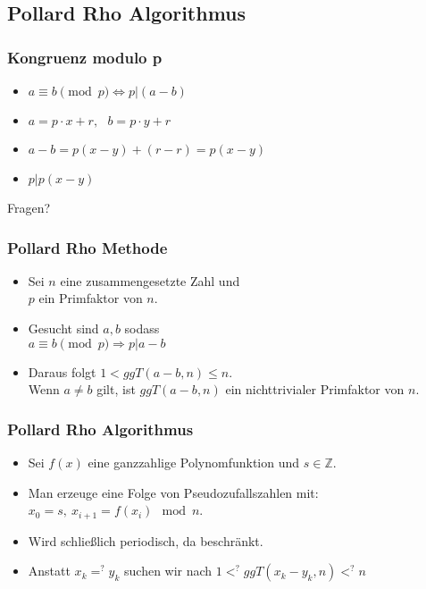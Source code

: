 \documentclass[mathserif, compress, german]{beamer}
\begin{document}
\subsection{Pollard Rho Algorithmus}

\begin{frame}
  \frametitle{Kongruenz modulo p}
  \begin{itemize}
	\item<1->$a \equiv b \pmod p \Leftrightarrow p|(a-b)$
\vspace{3mm}
	\item<2->$a=p\cdot x +r,\ \ \ b= p\cdot y +r$
\vspace{3mm}
	\item<3->$a-b=p(x-y)+(r-r)=p(x-y)$
\vspace{3mm}
	\item<4->$p|p(x-y)$
  \end{itemize}
\end{frame}

\begin{frame}
\centering Fragen?
\end{frame}


\begin{frame}
  \frametitle{Pollard Rho Methode}
  \begin{itemize}
    \item<2-> Sei $n$ eine zusammengesetzte Zahl und \\$p$ ein Primfaktor von $n$.
      \vspace{3mm}
    \item<3-> Gesucht sind $a, b$ sodass\\
              $a \equiv b \pmod p \Rightarrow p|a-b$ \\
      \vspace{3mm}
    \item<4-> Daraus folgt $1<ggT(a-b,n) \leq  n$. \\Wenn $a\not = b$ gilt, ist $ggT(a-b,n)$ ein nichttrivialer Primfaktor von $n$.
  \end{itemize}
\end{frame}

\begin{frame}
  \frametitle{Pollard Rho Algorithmus}
  \begin{itemize}
    \item<2-> Sei $f(x)$ eine ganzzahlige Polynomfunktion und $s \in \mathbb{Z}$.
     \vspace{3mm}
    \item<3-> Man erzeuge eine Folge von Pseudozufallszahlen mit:\\ $x_0= s, \ x_{i+1}=f(x_i)\mod n$.
   \vspace{3mm}
    \item<4-> Wird schlie\ss{}lich periodisch, da beschr\"ankt.
    \vspace{3mm}
    \item<5-> Anstatt $x_k=^?y_k$ suchen wir nach $1 <^? ggT(x_k - y_k, n)<^? n$
  \end{itemize}
\end{frame}
\end{document}
